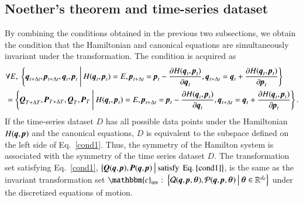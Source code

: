 \documentclass[preprint,
bibnotes,
 amsmath,amssymb,
 aps,
]{revtex4-1}
\begin{document}
\subsection{Noether's theorem and time-series dataset}
\label{noether_time}
By combining the conditions obtained in the previous two subsections, we obtain the condition that the Hamiltonian and canonical equations are simultaneously invariant under the transformation. The condition is acquired as
\begin{equation}
\begin{split}
\label{cond1}
 &\forall{E},\: \left\{\textit{\textbf{q}}_{t+\Delta t},\textit{\textbf{p}}_{t+\Delta t},\textit{\textbf{q}}_t,\textit{\textbf{p}}_t\:\middle|\: H(\textit{\textbf{q}}_t,\textit{\textbf{p}}_t) = E,  {\textit{\textbf{p}}}_{t+\Delta t} = {\textit{\textbf{p}}}_t-\frac{\partial{H(\textit{\textbf{q}}_t,\textit{\textbf{p}}_t)}}{\partial{\textit{\textbf{q}}}_t}, \textit{\textbf{q}}_{t+\Delta t} = \textit{\textbf{q}}_t + \frac{\partial{H(\textit{\textbf{q}}_t,\textit{\textbf{p}}_t)}}{\partial{\textit{\textbf{p}}_t}}\right\}\\
 &= \left\{\textit{\textbf{Q}}_{T+\Delta T},\textit{\textbf{P}}_{T+\Delta T},\textit{\textbf{Q}}_{T},\textit{\textbf{P}}_{T}\:\middle|\: H(\textit{\textbf{q}}_t,\textit{\textbf{p}}_t) = E,  {\textit{\textbf{p}}}_{t+\Delta t} = {\textit{\textbf{p}}}_t-\frac{\partial{H(\textit{\textbf{q}}_t,\textit{\textbf{p}}_t)}}{\partial{\textit{\textbf{q}}}_t}, \textit{\textbf{q}}_{t+\Delta t} = \textit{\textbf{q}}_t + \frac{\partial{H(\textit{\textbf{q}}_t,\textit{\textbf{p}}_t)}}{\partial{\textit{\textbf{p}}_t}}\right\}.
\end{split}
\end{equation}
If the time-series dataset $D$ has all possible data points under the Hamiltonian $H(\textit{\textbf{q}},\textit{\textbf{p}})$ and the canonical equations, $D$ is equivalent to the subspace defined on the left side of Eq.~\eqref{cond1}. 
Thus, the symmetry of the Hamilton system is associated with the symmetry of the time series dataset $D$. 
The transformation set satisfying Eq.~\eqref{cond1}, $\left\{\textit{\textbf{Q}}(\textit{\textbf{q}},\textit{\textbf{p}}),\textit{\textbf{P}}(\textit{\textbf{q}},\textit{\textbf{p}})\:\middle|\: {\rm satisfy}\:\:{\rm Eq.}\: \eqref{cond1}\right\}$, is the same as the invariant transformation set  $\mathbbm{c}_{\rm inv}:\:\left\{\mathbf{\mathcal{Q}}(\textit{\textbf{q}},\textit{\textbf{p}}, \boldsymbol{\theta}),\mathbf{\mathcal{P}}(\textit{\textbf{q}},\textit{\textbf{p}}, \boldsymbol{\theta})\:\middle|\: \boldsymbol{\theta} \in \mathbb{R}^{d_{\theta}} \right\}$ under the discretized equations of motion.\par 
\end{document}
